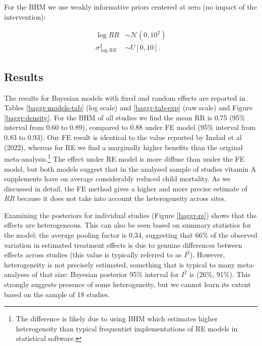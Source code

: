 \documentclass[12pt]{article}
\begin{document}
For the BHM we use weakly informative priors centered at zero (no impact of the intervention):

\begin{equation} \label{lognormal priors}
\begin{aligned}
\log{RR} &\sim  \mathcal{N}(0,10^2) \\
\sigma^2_{\log{RR}} &\sim U[0,10].
\end{aligned}
\end{equation}



\subsection{ Results  }


The results for Bayesian models with fixed and random effects are reported in Tables \ref{baggr-models-tab} (log scale) and \ref{baggr-tab-exp} (raw scale) and Figure \ref{baggr-density}. For the BHM of all studies we find the mean RR is 0.75 (95\% interval from 0.60 to 0.89), compared to 0.88 under FE model (95\% interval from 0.83 to 0.93). Our FE result is identical to the value reported by Imdad et al (2022), whereas for RE we find a marginally higher benefits than the original meta-analysis.\footnote{The difference is likely due to using BHM which estimates higher heterogeneity than typical frequentist implementations of RE models in statistical software.}
The effect under RE model is more diffuse than under the FE model, but both models suggest that in the analysed sample of studies vitamin A supplements have on average considerably reduced child mortality. As we discussed in detail, the FE method gives a higher and more precise estimate of $RR$ because it does not take into account the heterogeneity across sites. 

Examining the posteriors for individual studies (Figure \ref{baggr-re}) shows that the effects are heterogeneous. This can also be seen based on summary statistics for the model: the average pooling factor is 0.34, suggesting that 66\% of the observed variation in estimated treatment effects is due to genuine differences between effects across studies (this value is typically referred to as $I^2$). However, heterogeneity is not precisely estimated, something that is typical to many meta-analyses of that size: Bayesian posterior 95\% interval for $I^2$ is (26\%, 91\%). This strongly suggests presence of some heterogeneity, but we cannot learn its extent based on the sample of 18 studies.
\end{document}
